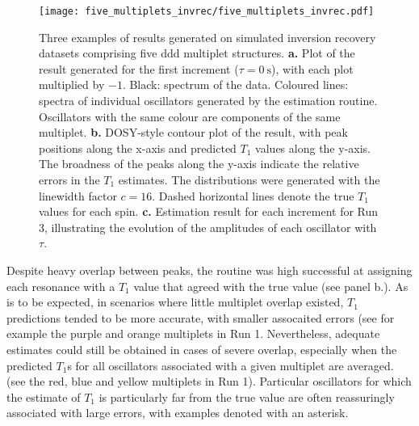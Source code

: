 \begin{figure}
    \texttt{[image: five\_multiplets\_invrec/five\_multiplets\_invrec.pdf]}
    \caption[
        Three examples of results generated on
        simulated inversion recovery datasets comprising five ddd multiplet
        structures.
    ]
    {
        Three examples of results generated on
        simulated inversion recovery datasets comprising five ddd multiplet
        structures.
        \textbf{a.} Plot of the result generated for the first increment ($\tau
        = \qty{0}{\second}$), with each plot multiplied by $-1$. Black:
        spectrum of the data. Coloured lines: spectra of individual oscillators
        generated by the estimation routine. Oscillators with the same colour
        are components of the same multiplet.
        \textbf{b.} \ac{DOSY}-style contour plot of the result, with peak
        positions along the x-axis and predicted $T_1$ values along the y-axis.
        The broadness of the peaks along the y-axis indicate the relative
        errors in the $T_1$ estimates. The distributions were generated with
        the linewidth factor  $c=16$.
        Dashed horizontal lines denote the true
        $T_1$ values for each spin.
        \textbf{c.} Estimation result for each increment for Run 3,
        illustrating the evolution of the amplitudes of each oscillator with
        $\tau$.
    }
    \label{fig:five-multiplets-invrec}
\end{figure}
Despite heavy overlap between peaks, the routine was high successful at
assigning each resonance with a $T_1$ value that agreed with the true value
(see panel b.). As is to be expected, in scenarios where little multiplet
overlap existed, $T_1$ predictions tended to be more accurate, with smaller
assocaited errors (see for example the purple and orange multiplets in Run 1.
Nevertheless, adequate estimates could still be obtained in cases of severe
overlap, especially when the predicted $T_1$s for all oscillators associated
with a given multiplet are averaged. (see the red, blue and yellow multiplets
in Run 1). Particular oscillators for which the estimate of $T_1$ is particularly far from the true value are often reassuringly associated with large errors, with examples denoted with an asterisk.
